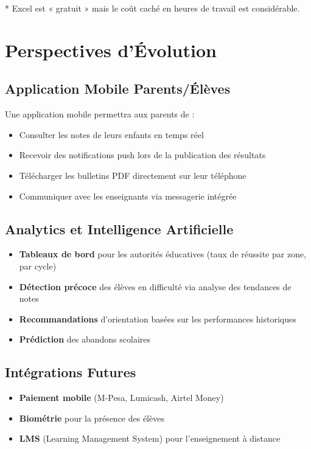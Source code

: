 \documentclass[12pt,a4paper,oneside]{report}
\begin{document}
* Excel est « gratuit » mais le coût caché en heures de travail est considérable.


\chapter{Perspectives d'Évolution}

\section{Application Mobile Parents/Élèves}

Une application mobile permettra aux parents de :
\begin{itemize}
  \item Consulter les notes de leurs enfants en temps réel
  \item Recevoir des notifications push lors de la publication des résultats
  \item Télécharger les bulletins PDF directement sur leur téléphone
  \item Communiquer avec les enseignants via messagerie intégrée
\end{itemize}

\section{Analytics et Intelligence Artificielle}

\begin{itemize}
  \item \textbf{Tableaux de bord} pour les autorités éducatives (taux de réussite par zone, par cycle)
  \item \textbf{Détection précoce} des élèves en difficulté via analyse des tendances de notes
  \item \textbf{Recommandations} d'orientation basées sur les performances historiques
  \item \textbf{Prédiction} des abandons scolaires
\end{itemize}

\section{Intégrations Futures}

\begin{itemize}
  \item \textbf{Paiement mobile} (M-Pesa, Lumicash, Airtel Money)
  \item \textbf{Biométrie} pour la présence des élèves
  \item \textbf{LMS} (Learning Management System) pour l'enseignement à distance
\end{itemize}
\end{document}
